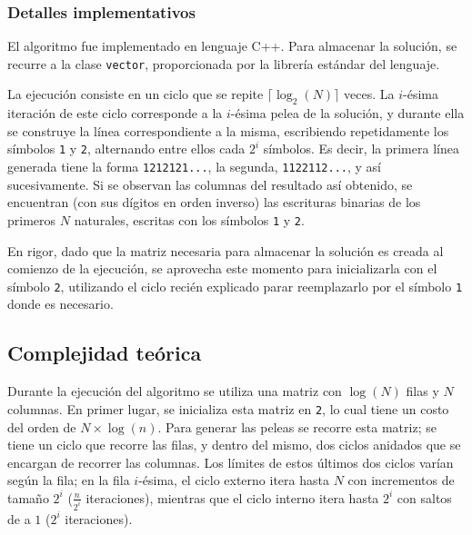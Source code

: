         \subsubsection{Detalles implementativos}
            El algoritmo fue implementado en lenguaje C++. Para almacenar la solución, se recurre a la clase \texttt{vector}, proporcionada por la librería estándar del lenguaje.

            La ejecución consiste en un ciclo que se repite $\lceil \log_2(N) \rceil$ veces. La $i$-ésima iteración de este ciclo corresponde a la $i$-ésima pelea de la solución, y durante ella se construye la línea correspondiente a la misma, escribiendo repetidamente los símbolos \texttt{1} y \texttt{2}, alternando entre ellos cada $2^i$ símbolos. Es decir, la primera línea generada tiene la forma \texttt{1212121...}, la segunda, \texttt{1122112...}, y así sucesivamente. Si se observan las columnas del resultado así obtenido, se encuentran (con sus dígitos en orden inverso) las escrituras binarias de los primeros $N$ naturales, escritas con los símbolos \texttt{1} y \texttt{2}.

            En rigor, dado que la matriz necesaria para almacenar la solución es creada al comienzo de la ejecución, se aprovecha este momento para inicializarla con el símbolo \texttt{2}, utilizando el ciclo recién explicado parar reemplazarlo por el símbolo \texttt{1} donde es necesario.


    \subsection{Complejidad teórica}
         
      Durante la ejecución del algoritmo se utiliza una matriz con $\log(N)$ filas y $N$ columnas. En primer lugar, se inicializa esta matriz en \texttt{2}, lo cual tiene un costo del orden de $N \times \log(n)$. Para generar las peleas se recorre esta matriz; se tiene un ciclo que recorre las filas, y dentro del mismo, dos ciclos anidados que se encargan de recorrer las columnas. Los límites de estos últimos dos ciclos varían según la fila; en la fila $i$-ésima, el ciclo externo itera hasta $N$ con incrementos de tamaño $2^i$ ($\frac{n}{2^i}$ iteraciones), mientras que el ciclo interno itera hasta $2^i$ con saltos de a $1$ ($2^i$ iteraciones).

